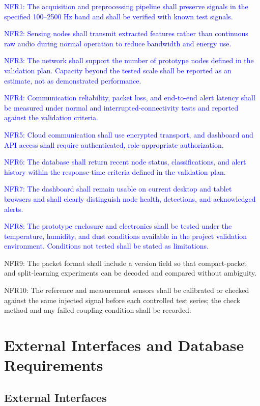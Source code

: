 \documentclass[12pt,a4paper,oneside]{memoir}
\newcommand{\earlierrevision}[1]{\textcolor{blue}{#1}}
\newcommand{\newrevision}[1]{\textcolor{green!45!black}{#1}}
\begin{document}
\earlierrevision{NFR1: The acquisition and preprocessing pipeline shall preserve signals in the specified 100--2500 Hz band and shall be verified with known test signals.}

\earlierrevision{NFR2: Sensing nodes shall transmit extracted features rather than continuous raw audio during normal operation to reduce bandwidth and energy use.}

\earlierrevision{NFR3: The network shall support the number of prototype nodes defined in the validation plan. Capacity beyond the tested scale shall be reported as an estimate, not as demonstrated performance.}

\earlierrevision{NFR4: Communication reliability, packet loss, and end-to-end alert latency shall be measured under normal and interrupted-connectivity tests and reported against the validation criteria.}

\earlierrevision{NFR5: Cloud communication shall use encrypted transport, and dashboard and API access shall require authenticated, role-appropriate authorization.}

\earlierrevision{NFR6: The database shall return recent node status, classifications, and alert history within the response-time criteria defined in the validation plan.}

\earlierrevision{NFR7: The dashboard shall remain usable on current desktop and tablet browsers and shall clearly distinguish node health, detections, and acknowledged alerts.}

\earlierrevision{NFR8: The prototype enclosure and electronics shall be tested under the temperature, humidity, and dust conditions available in the project validation environment. Conditions not tested shall be stated as limitations.}

\newrevision{NFR9: The packet format shall include a version field so that compact-packet and split-learning experiments can be decoded and compared without ambiguity.}

\newrevision{NFR10: The reference and measurement sensors shall be calibrated or checked against the same injected signal before each controlled test series; the check method and any failed coupling condition shall be recorded.}
 
\section{External Interfaces and Database Requirements}
 
\subsection*{External Interfaces}
 
\end{document}
